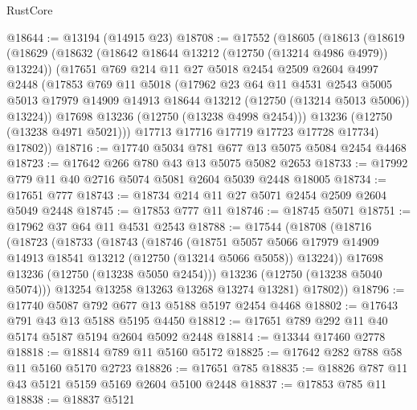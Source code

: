 \begin{lexlean}{RustCore}
\begin{coremodule}
@18644 := @13194 (@14915 @23)
@18708 := @17552
    (@18605
      (@18613
        (@18619
          (@18629
            (@18632 (@18642 @18644 @13212 (@12750 (@13214 @4986 @4979)) @13224))
            (@17651
              @769
              @214
              @11
              @27
              @5018
              @2454
              @2509
              @2604
              @4997
              @2448
              (@17853
                @769
                @11
                @5018
                (@17962
                  @23
                  @64
                  @11
                  @4531
                  @2543
                  @5005
                  @5013
                  @17979
                  @14909
                  @14913
                  @18644
                  @13212
                  (@12750 (@13214 @5013 @5006))
                  @13224))
              @17698
              @13236
              (@12750 (@13238 @4998 @2454)))
            @13236
            (@12750 (@13238 @4971 @5021)))
          @17713
          @17716
          @17719
          @17723
          @17728
          @17734)
        @17802))
@18716 := @17740 @5034 @781 @677 @13 @5075 @5084 @2454 @4468
@18723 := @17642 @266 @780 @43 @13 @5075 @5082 @2653
@18733 := @17992 @779 @11 @40 @2716 @5074 @5081 @2604 @5039 @2448 @18005
@18734 := @17651 @777
@18743 := @18734 @214 @11 @27 @5071 @2454 @2509 @2604 @5049 @2448
@18745 := @17853 @777 @11
@18746 := @18745 @5071
@18751 := @17962 @37 @64 @11 @4531 @2543
@18788 := @17544
    (@18708
      (@18716
        (@18723
          (@18733
            (@18743
              (@18746
                (@18751
                  @5057
                  @5066
                  @17979
                  @14909
                  @14913
                  @18541
                  @13212
                  (@12750 (@13214 @5066 @5058))
                  @13224))
              @17698
              @13236
              (@12750 (@13238 @5050 @2454)))
            @13236
            (@12750 (@13238 @5040 @5074)))
          @13254
          @13258
          @13263
          @13268
          @13274
          @13281)
        @17802))
@18796 := @17740 @5087 @792 @677 @13 @5188 @5197 @2454 @4468
@18802 := @17643 @791 @43 @13 @5188 @5195 @4450
@18812 := @17651 @789 @292 @11 @40 @5174 @5187 @5194 @2604 @5092 @2448
@18814 := @13344 @17460 @2778
@18818 := @18814 @789 @11 @5160 @5172
@18825 := @17642 @282 @788 @58 @11 @5160 @5170 @2723
@18826 := @17651 @785
@18835 := @18826 @787 @11 @43 @5121 @5159 @5169 @2604 @5100 @2448
@18837 := @17853 @785 @11
@18838 := @18837 @5121

\end{coremodule}
\end{lexlean}
